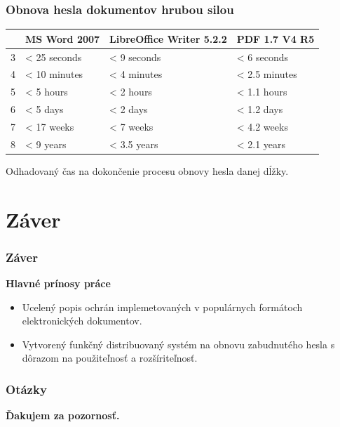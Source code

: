\documentclass[xcolor=dvipsnames]{beamer}
\def\itemtitle#1{{\bfseries#1\smallskip}}
\begin{document}
\begin{frame}
	\frametitle{Obnova hesla dokumentov hrubou silou}
	
	 \begin{table}[h]
	\centering
	\begin{tabular}{|l|l|l|l|}
           \hline
		&\textbf{MS Word 2007}&\textbf{LibreOffice Writer 5.2.2}&\textbf{PDF 1.7 V4 R5}\\
	\hline
		3&< 25 seconds&< 9 seconds&< 6 seconds\\
	\hline
		4&< 10 minutes&< 4 minutes&< 2.5 minutes\\
	\hline
		5&< 5 hours& < 2 hours&< 1.1 hours\\
	\hline
		6&< 5 days&< 2 days&< 1.2 days\\
	\hline
		7&< 17 weeks&< 7 weeks&< 4.2 weeks\\
	\hline
		8&< 9 years&< 3.5 years&< 2.1 years\\
	\hline
           \end{tabular}
	\end{table}
\begin{center}	
	\vspace{-5mm}
	\scriptsize{Odhadovaný čas na dokončenie procesu obnovy hesla danej dĺžky.}
\end{center}
\end{frame}


\section{Záver}
\begin{frame}
	\frametitle{Záver}

	\itemtitle{Hlavné prínosy práce}
	\begin{itemize}
		\item Ucelený popis ochrán implemetovaných v populárnych formátoch elektronických dokumentov.
		\item Vytvorený funkčný distribuovaný systém na obnovu zabudnutého hesla s dôrazom na použiteľnosť a rozšíriteľnosť.
	\end{itemize}
		
\end{frame}



\begin{frame}
   \frametitle{Otázky}
 	\vspace*{\fill}

 	\begin{center} 		
 		\huge\bfseries{} Ďakujem za pozornosť.\\~\\
 	\end{center}
 	\vspace*{\fill}
 \end{frame}
\end{document}
